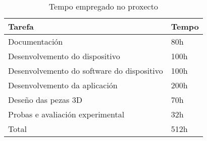 \begin{table}[tb]
    \label{c:custos humanos}
    \begin{center}
        \begin{tabular}{|l|l|}
            \hline
             Tarefa & Tempo\\ \hline
             Documentación & 80h \\ \hline
             Desenvolvemento do dispositivo & 100h \\ \hline
             Desenvolvemento do software do dispositivo & 100h \\ \hline
             Desenvolvemento da aplicación & 200h \\ \hline
             Deseño das pezas 3D & 70h \\ \hline
             Probas e avaliación experimental & 32h\\ \hline
             Total & 512h \\ \hline
        \end{tabular}
    \end{center}
    \caption{Tempo empregado no proxecto}
    \label{tab:my_label}
\end{table}
